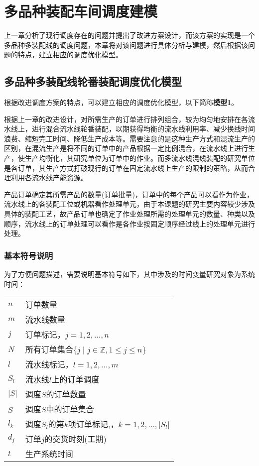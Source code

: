 \chapter{多品种装配车间调度建模}
上一章分析了现行调度存在的问题并提出了改进方案设计，而该方案的实现是一个多品种多装配线的调度问题，本章将对该问题进行具体分析与建模，然后根据该问题的特点，建立相应的调度优化模型。


\section{多品种多装配线轮番装配调度优化模型}
根据改进调度方案的特点，可以建立相应的调度优化模型，以下简称\textbf{模型1}。


根据上一章的改进设计，对所需生产的订单进行排列组合，较为均匀地安排在各流水线上，进行混合流水线轮番装配，以期获得均衡的流水线利用率、减少换线时间浪费、缩短完工时间、降低生产成本等。需要注意的是这种生产方式和混流生产的区别，在混流生产是将不同的订单中的产品根据一定比例混合，在流水线上进行生产，使生产均衡化，其研究单位为订单中的作业。而多流水线混线装配的研究单位是各订单，其生产方式打破现行的订单在固定流水线上生产的限制的策略，从而合理利用各流水线产能资源。

产品订单确定其所需产品的数量(订单批量)，订单中的每个产品可以看作为作业，流水线上的各装配工位或机器看作处理单元，由于本课题的研究主要内容较少涉及具体的装配工艺，故产品订单也确定了作业处理所需的处理单元的数量、种类以及顺序，流水线上的订单处理可以看作是各作业按固定顺序经过线上的处理单元进行处理。

\subsection{基本符号说明}
为了方便问题描述，需要说明基本符号如下，其中涉及的时间变量研究对象为系统时间：\\[3pt]
\begin{supertabular}{ll}
$n$ & 订单数量\\
$m$ & 流水线数量\\
$j$ & 订单标记，$j = 1,2,...,n$\\
$N$ & 所有订单集合$\{ j\mid j \in \mathbb{Z}, 1\le j \le n  \}$\\
$l$ & 流水线标记，$l = 1,2,...,m$\\
$S_l$ & 流水线$l$上的订单调度\\
$|S|$ & 调度$S$的订单数量\\
$\overline S$ & 调度$S$中的订单集合\\
$l_k$ & 调度$S_l$的第$k$项订单标记,，$k = 1,2,...,|S_l|$\\
$d_j$ & 订单$j$的交货时刻(工期)\\
$t$ & 生产系统时间\\[3pt]
\end{supertabular}

